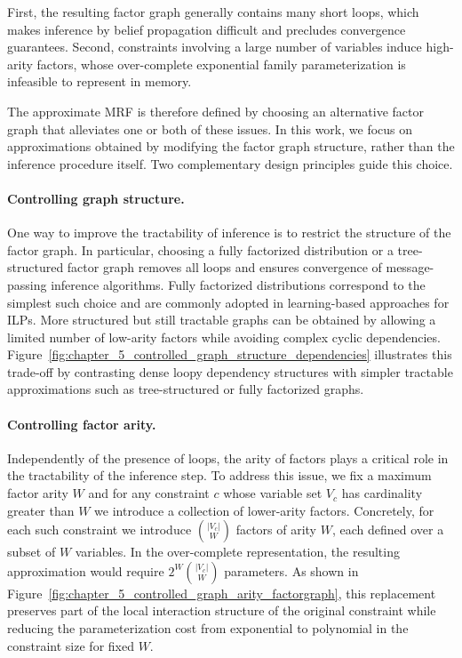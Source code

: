 First, the resulting factor graph generally contains many short loops, which makes inference by belief propagation difficult and precludes convergence guarantees. Second, constraints involving a large number of variables induce high-arity factors, whose over-complete exponential family parameterization is infeasible to represent in memory.

The approximate MRF is therefore defined by choosing an alternative factor graph that alleviates one or both of these issues. In this work, we focus on approximations obtained by modifying the factor graph structure, rather than the inference procedure itself. Two complementary design principles guide this choice.

\paragraph{Controlling graph structure.}
One way to improve the tractability of inference is to restrict the structure of the factor graph. In particular, choosing a fully factorized distribution or a tree-structured factor graph removes all loops and ensures convergence of message-passing inference algorithms. Fully factorized distributions correspond to the simplest such choice and are commonly adopted in learning-based approaches for ILPs. More structured but still tractable graphs can be obtained by allowing a limited number of low-arity factors while avoiding complex cyclic dependencies. Figure~\ref{fig:chapter_5_controlled_graph_structure_dependencies} illustrates this trade-off by contrasting dense loopy dependency structures with simpler tractable approximations such as tree-structured or fully factorized graphs.



\paragraph{Controlling factor arity.}
Independently of the presence of loops, the arity of factors plays a critical role in the tractability of the inference step. To address this issue, we fix a maximum factor arity $W$ and for any constraint $c$ whose variable set $V_c$ has cardinality greater than $W$ we introduce a collection of lower-arity factors. Concretely, for each such constraint we introduce $\binom{|V_c|}{W}$ factors of arity $W$, each defined over a subset of $W$ variables. In the over-complete representation, the resulting approximation would require  $2^W \binom{|V_c|}{W}$ parameters. As shown in Figure~\ref{fig:chapter_5_controlled_graph_arity_factorgraph}, this replacement preserves part of the local interaction structure of the original constraint while reducing the parameterization cost from exponential to polynomial in the constraint size for fixed $W$.

